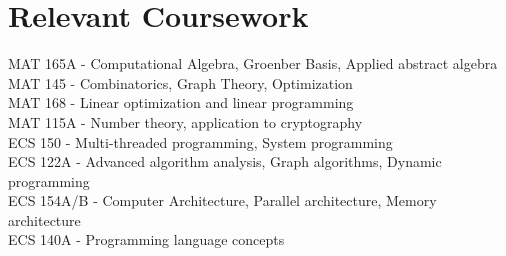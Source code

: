 \section{\sc Relevant Coursework}
MAT 165A - Computational Algebra, Groenber Basis, Applied abstract algebra\\
MAT 145 - Combinatorics, Graph Theory, Optimization\\
MAT 168 - Linear optimization and linear programming\\
MAT 115A - Number theory, application to cryptography\\
ECS 150 - Multi-threaded programming, System programming\\
ECS 122A - Advanced algorithm analysis, Graph algorithms, Dynamic programming\\
ECS 154A/B - Computer Architecture, Parallel architecture, Memory architecture\\
ECS 140A - Programming language concepts
\endinput